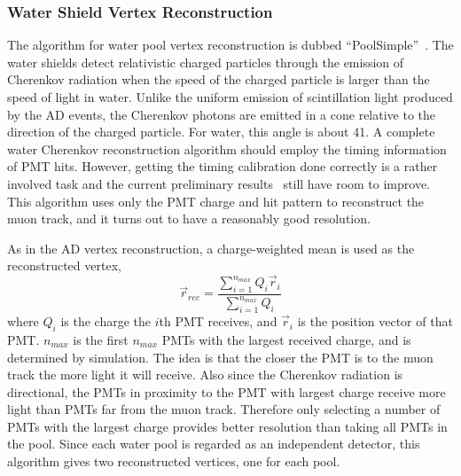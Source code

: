 \subsubsection{Water Shield Vertex Reconstruction}
The algorithm for water pool vertex reconstruction is dubbed ``PoolSimple''~\cite{docdb7838}. The water shields detect relativistic charged particles through the emission of Cherenkov radiation when the speed of the charged particle is larger than the speed of light in water. Unlike the uniform emission of scintillation light produced by the AD events, the Cherenkov photons are emitted in a cone relative to the direction of the charged particle. For water, this angle is about 41\textdegree. A complete water Cherenkov reconstruction algorithm should employ the timing information of PMT hits. However, getting the timing calibration done correctly is a rather involved task and the current preliminary results~\cite{docdb7696} still have room to improve. This algorithm uses only the PMT charge and hit pattern to reconstruct the muon track, and it turns out to have a reasonably good resolution.

As in the AD vertex reconstruction, a charge-weighted mean is used as the reconstructed vertex,
\begin{equation}
	\vec{r}_{rec}=\frac{\sum\limits_{i=1}^{n_{max}}Q_i\vec{r}_i}{\sum\limits_{i=1}^{n_{max}}Q_i}
\end{equation}
where $Q_i$ is the charge the $i$th PMT receives, and $\vec{r}_i$ is the position vector of that PMT. $n_{max}$ is the first $n_{max}$ PMTs with the largest received charge, and is determined by simulation. The idea is that the closer the PMT is to the muon track the more light it will receive. Also since the Cherenkov radiation is directional, the PMTs in proximity to the PMT with largest charge receive more light than PMTs far from the muon track. Therefore only selecting a number of PMTs with the largest charge provides better resolution than taking all PMTs in the pool. Since each water pool is regarded as an independent detector, this algorithm gives two reconstructed vertices, one for each pool.

